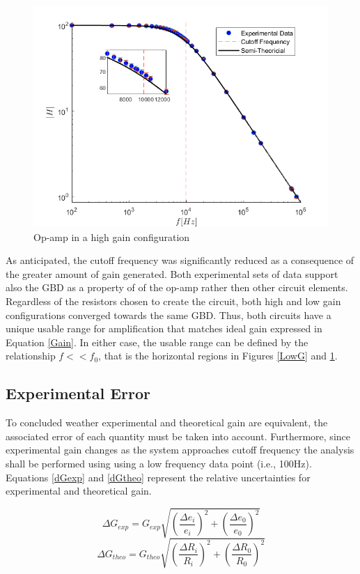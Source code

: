 \documentclass[letterpaper,12pt]{article}
\begin{document}
\begin{figure}[ht]
    \centering
    \includegraphics[scale = .6]{HighGain.png}
    \caption{Op-amp in a high gain configuration}
    \label{HighG}
\end{figure}
As anticipated, the cutoff frequency was significantly reduced as a consequence of the greater amount of gain generated. Both experimental sets of data support also the GBD as a property of of the op-amp rather then other circuit elements. Regardless of the resistors chosen to create the circuit, both high and low gain configurations converged towards the same GBD. Thus, both circuits have a unique usable range for amplification that matches ideal gain expressed in Equation \ref{Gain}. In either case, the usable range can be defined by the relationship $f<<f_0$, that is the horizontal regions in Figures \ref{LowG} and \ref{HighG}.

\subsection{Experimental Error}
To concluded weather experimental and theoretical gain are equivalent, the associated error of each quantity must be taken into account. Furthermore, since experimental gain changes as the system approaches cutoff frequency the analysis shall be performed using using a low frequency data point (i.e., 100Hz). Equations \ref{dGexp} and \ref{dGtheo} represent the relative uncertainties for experimental and theoretical gain. 

\begin{equation}
    \Delta G_{exp} = G_{exp} \sqrt{ (\frac{\Delta e_i}{e_i})^2 + (\frac{\Delta e_0}{e_0})^2}
    \label{dGexp}
\end{equation}
\begin{equation}
    \Delta G_{theo} = G_{theo}\sqrt{(\frac{\Delta R_i}{R_i})^2 + (\frac{\Delta R_0}{R_0})^2 }
    \label{dGtheo}
\end{equation}
\end{document}
